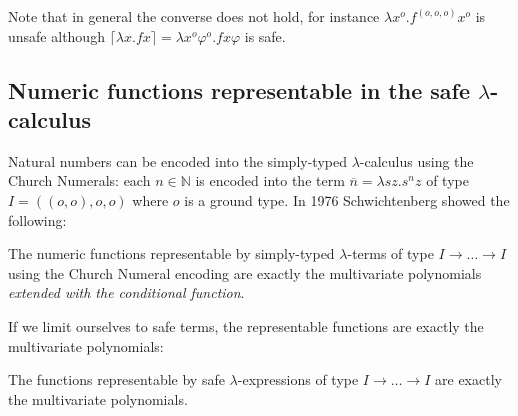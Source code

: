 \documentclass{llncs}
\newcommand{\elnf}[1]{\lceil #1\rceil} %
\newcommand{\encode}[1]{\overline{#1}} \newcommand\dps{\displaystyle}
\newcommand\nat{\mathbb{N}}
\begin{document}
Note that in general the converse does not hold, for instance $\lambda
x^o . f^{(o,o,o)} x^o$ is unsafe although $\elnf{\lambda x . f x} =
\lambda x^o \varphi^o . f x \varphi$ is safe.

\subsection{Numeric functions representable in the safe $\lambda$-calculus}

Natural numbers can be encoded into the simply-typed
$\lambda$-calculus using the Church Numerals: each $n\in\nat$ is
encoded into the term $\encode{n} = \lambda s z. s^n z$ of type $I =
((o,o),o,o)$ where $o$ is a ground type. In 1976 Schwichtenberg
\cite{citeulike:622637} showed the following:


\begin{theorem}[Schwichtenberg 1976]
The numeric functions representable by simply-typed $\lambda$-terms of
type $I\rightarrow \ldots \rightarrow I$ using the Church Numeral
encoding are exactly the multivariate polynomials \emph{extended with
the conditional function}.
\end{theorem}

If we limit ourselves to safe terms, the representable functions are
exactly the multivariate polynomials:
\begin{theorem}
\label{thm:polychar}
The functions representable by safe $\lambda$-expressions of type
$I\rightarrow \ldots \rightarrow I$ are exactly the multivariate
polynomials.
\end{theorem}
\end{document}
